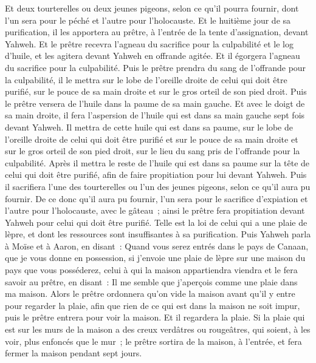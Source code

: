\begin{multicols}{2}
Et deux tourterelles ou deux jeunes pigeons, selon ce qu'il pourra fournir, dont l'un sera pour le péché et l'autre pour l'holocauste.
Et le huitième jour de sa purification, il les apportera au prêtre, à l'entrée de la tente d'assignation, devant Yahweh.
Et le prêtre recevra l'agneau du sacrifice pour la culpabilité et le log d'huile, et les agitera devant Yahweh en offrande agitée.
Et il égorgera l'agneau du sacrifice pour la culpabilité. Puis le prêtre prendra du sang de l'offrande pour la culpabilité, il le mettra sur le lobe de l'oreille droite de celui qui doit être purifié, sur le pouce de sa main droite et sur le gros orteil de son pied droit.
Puis le prêtre versera de l'huile dans la paume de sa main gauche.
Et avec le doigt de sa main droite, il fera l'aspersion de l'huile qui est dans sa main gauche sept fois devant Yahweh.
Il mettra de cette huile qui est dans sa paume, sur le lobe de l'oreille droite de celui qui doit être purifié et sur le pouce de sa main droite et sur le gros orteil de son pied droit, sur le lieu du sang pris de l'offrande pour la culpabilité.
Après il mettra le reste de l'huile qui est dans sa paume sur la tête de celui qui doit être purifié, afin de faire propitiation pour lui devant Yahweh.
Puis il sacrifiera l'une des tourterelles ou l'un des jeunes pigeons, selon ce qu'il aura pu fournir.
De ce donc qu'il aura pu fournir, l'un sera pour le sacrifice d'expiation et l'autre pour l'holocauste, avec le gâteau~; ainsi le prêtre fera propitiation devant Yahweh pour celui qui doit être purifié.
Telle est la loi de celui qui a une plaie de lèpre, et dont les ressources sont insuffisantes à sa purification.
Puis Yahweh parla à Moïse et à Aaron, en disant~:
Quand vous serez entrés dans le pays de Canaan, que je vous donne en possession, si j'envoie une plaie de lèpre sur une maison du pays que vous posséderez,
celui à qui la maison appartiendra viendra et le fera savoir au prêtre, en disant~: Il me semble que j'aperçois comme une plaie dans ma maison.
Alors le prêtre ordonnera qu'on vide la maison avant qu'il y entre pour regarder la plaie, afin que rien de ce qui est dans la maison ne soit impur, puis le prêtre entrera pour voir la maison.
Et il regardera la plaie. Si la plaie qui est sur les murs de la maison a des creux verdâtres ou rougeâtres, qui soient, à les voir, plus enfoncés que le mur~;
le prêtre sortira de la maison, à l'entrée, et fera fermer la maison pendant sept jours.

\end{multicols}
